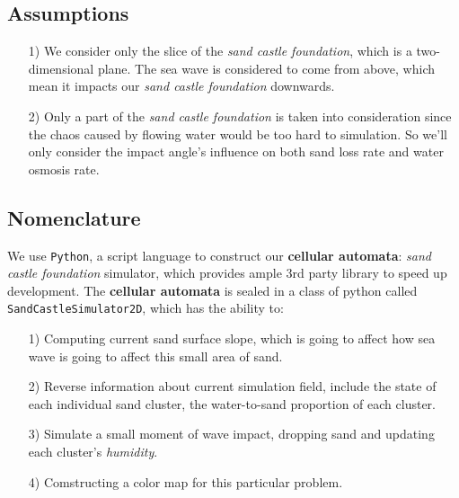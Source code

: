 \documentclass[12pt]{article}
\begin{document}
\subsection{Assumptions}
\begin{itemize}
    \item [1)]
          We consider only the slice of the \textit{sand castle foundation}, which is a two-dimensional plane. The sea wave is considered to come from above, which mean it impacts our \textit{sand castle foundation} downwards.
    \item [2)]
          Only a part of the \textit{sand castle foundation} is taken into consideration since the chaos caused by flowing water would be too hard to simulation. So we'll only consider the impact angle's influence on both sand loss rate and water osmosis rate.
\end{itemize}

\subsection{Nomenclature}
We use \texttt{Python}, a script language to construct our \textbf{cellular automata}: \textit{sand castle foundation} simulator, which provides ample 3rd party library to speed up development. The \textbf{cellular automata} is sealed in a class of python called \texttt{SandCastleSimulator2D}, which has the ability to:

\begin{itemize}
    \item [1)]
          Computing current sand surface slope, which is going to affect how sea wave is going to affect this small area of sand.
    \item [2)]
          Reverse information about current simulation field, include the state of each individual sand cluster, the water-to-sand proportion of each cluster.
    \item [3)]
          Simulate a small moment of wave impact, dropping sand and updating each cluster's \textit{humidity}.
    \item [4)]
          Comstructing a color map for this particular problem.
\end{itemize}
\end{document}
